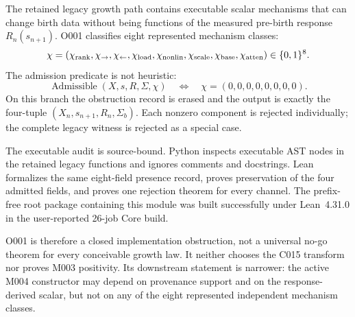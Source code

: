 The retained legacy growth path contains executable scalar mechanisms that can
change birth data without being functions of the measured pre-birth response
\(R_n(s_{n+1})\).  O001 classifies eight represented mechanism classes:
\[
 \chi=(\chi_{\rm rank},\chi_{\to},\chi_{\leftarrow},
 \chi_{\rm load},\chi_{\rm nonlin},\chi_{\rm scale},
 \chi_{\rm base},\chi_{\rm atten})\in\{0,1\}^8.
\]
The admission predicate is not heuristic:
\[
 \operatorname{Admissible}(X,s,R,\Sigma,\chi)
 \quad\Longleftrightarrow\quad \chi=(0,0,0,0,0,0,0,0).
\]
On this branch the obstruction record is erased and the output is exactly the
four-tuple \((X_n,s_{n+1},R_n,\Sigma_b)\).  Each nonzero component is rejected
individually; the complete legacy witness is rejected as a special case.

The executable audit is source-bound.  Python inspects executable AST nodes in
the retained legacy functions and ignores comments and docstrings.  Lean
formalizes the same eight-field presence record, proves preservation of the
four admitted fields, and proves one rejection theorem for every channel.  The
prefix-free root package containing this module was built successfully under
Lean~4.31.0 in the user-reported 26-job Core build.

O001 is therefore a closed implementation obstruction, not a universal no-go
theorem for every conceivable growth law.  It neither chooses the C015
transform nor proves M003 positivity.  Its downstream statement is narrower:
the active M004 constructor may depend on provenance support and on the
response-derived scalar, but not on any of the eight represented independent
mechanism classes.


